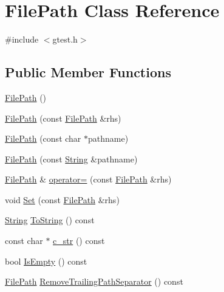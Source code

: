 \hypertarget{classtesting_1_1internal_1_1FilePath}{\section{\-File\-Path \-Class \-Reference}
\label{de/dea/classtesting_1_1internal_1_1FilePath}
}


{\ttfamily \#include $<$gtest.\-h$>$}

\subsection*{\-Public \-Member \-Functions}
\begin{DoxyCompactItemize}
\item 
\hyperlink{classtesting_1_1internal_1_1FilePath_aa5df70ab39fdaff6e3fce46e8d35b608}{\-File\-Path} ()
\item 
\hyperlink{classtesting_1_1internal_1_1FilePath_a7221ea73ecd74af3aca8c7e36910ca54}{\-File\-Path} (const \hyperlink{classtesting_1_1internal_1_1FilePath}{\-File\-Path} \&rhs)
\item 
\hyperlink{classtesting_1_1internal_1_1FilePath_a1aa42b124df2c0e7782e42e92d0d4b2f}{\-File\-Path} (const char $\ast$pathname)
\item 
\hyperlink{classtesting_1_1internal_1_1FilePath_aaeb318bdf958a4c69cd1597ba6078da6}{\-File\-Path} (const \hyperlink{classtesting_1_1internal_1_1String}{\-String} \&pathname)
\item 
\hyperlink{classtesting_1_1internal_1_1FilePath}{\-File\-Path} \& \hyperlink{classtesting_1_1internal_1_1FilePath_a56ce97a342d8d71d4abedca3f5666ab1}{operator=} (const \hyperlink{classtesting_1_1internal_1_1FilePath}{\-File\-Path} \&rhs)
\item 
void \hyperlink{classtesting_1_1internal_1_1FilePath_a42b263db98b0796b43578baca9ba991d}{\-Set} (const \hyperlink{classtesting_1_1internal_1_1FilePath}{\-File\-Path} \&rhs)
\item 
\hyperlink{classtesting_1_1internal_1_1String}{\-String} \hyperlink{classtesting_1_1internal_1_1FilePath_abf9cb98d5859802d6b90f01feda7b3ff}{\-To\-String} () const 
\item 
const char $\ast$ \hyperlink{classtesting_1_1internal_1_1FilePath_a89da6be964480b4c86334e4e337d3cf2}{c\-\_\-str} () const 
\item 
bool \hyperlink{classtesting_1_1internal_1_1FilePath_aaef62c8761ddd1b95824fc57b1b277b5}{\-Is\-Empty} () const 
\item 
\hyperlink{classtesting_1_1internal_1_1FilePath}{\-File\-Path} \hyperlink{classtesting_1_1internal_1_1FilePath_a1591ddf32643fbba08640b56ad0db787}{\-Remove\-Trailing\-Path\-Separator} () const 

\end{DoxyCompactItemize}
